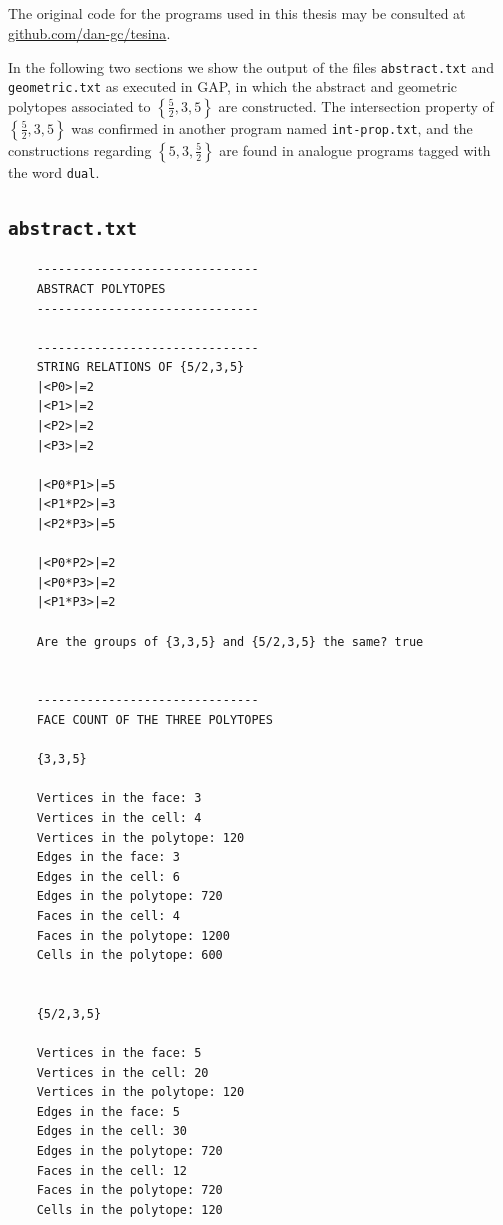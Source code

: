 \documentclass{article}
\theoremstyle{definition}
\begin{document}
\clearpage
\begin{appendices}
\section{}\label{app:A}
The original code for the programs used in this thesis may be consulted at \linebreak \href{https://github.com/dan-gc/tesina}{github.com/dan-gc/tesina}.

In the following two sections we show the output of the files \texttt{abstract.txt} and \texttt{geometric.txt} as executed in GAP, in which the abstract and geometric polytopes associated to $\left\{\frac{5}{2},3,5\right\}$ are constructed. The intersection property of $\left\{\frac{5}{2},3,5\right\}$ was confirmed in another program named \texttt{int-prop.txt}, and the constructions regarding $\left\{5,3,\frac{5}{2}\right\}$ are found in analogue programs tagged with the word \texttt{dual}. 

\subsection{\texttt{abstract.txt}}\label{app:1}

\begin{changemargin}{-2cm}{-2cm}
\begin{multicols}{2}
\begin{lstlisting}
	-------------------------------
	ABSTRACT POLYTOPES
	-------------------------------
	
	-------------------------------
	STRING RELATIONS OF {5/2,3,5}
	|<P0>|=2
	|<P1>|=2
	|<P2>|=2
	|<P3>|=2
	
	|<P0*P1>|=5
	|<P1*P2>|=3
	|<P2*P3>|=5
	
	|<P0*P2>|=2
	|<P0*P3>|=2
	|<P1*P3>|=2
	
	Are the groups of {3,3,5} and {5/2,3,5} the same? true
	
	
	-------------------------------
	FACE COUNT OF THE THREE POLYTOPES
	
	{3,3,5}
	
	Vertices in the face: 3
	Vertices in the cell: 4
	Vertices in the polytope: 120
	Edges in the face: 3
	Edges in the cell: 6
	Edges in the polytope: 720
	Faces in the cell: 4
	Faces in the polytope: 1200
	Cells in the polytope: 600
	
	
	{5/2,3,5}
	
	Vertices in the face: 5
	Vertices in the cell: 20
	Vertices in the polytope: 120
	Edges in the face: 5
	Edges in the cell: 30
	Edges in the polytope: 720
	Faces in the cell: 12
	Faces in the polytope: 720
	Cells in the polytope: 120
	

\end{lstlisting}
\end{multicols}
\end{changemargin}
\end{appendices}
\end{document}
